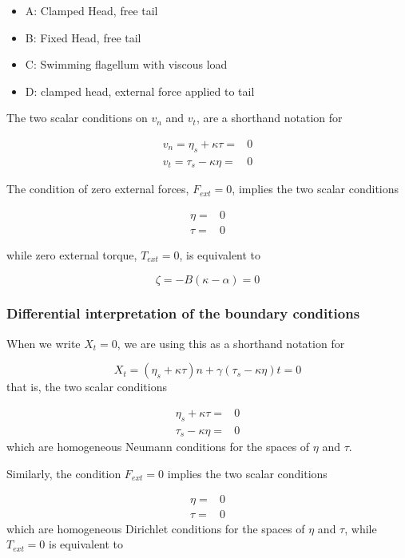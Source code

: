 \documentclass[12pt]{article}
\begin{document}
\begin{itemize}
\item A: Clamped Head, free tail
\item B: Fixed Head, free tail
\item C: Swimming flagellum with viscous load 
\item D: clamped head, external force applied to tail
\end{itemize}

The two scalar conditions on $v_n$ and $v_t$, are a shorthand notation for

$$
\begin{aligned}
v_n = \eta_s + \kappa \tau = & 0 \\
v_t = \tau_s - \kappa \eta = & 0
\end{aligned}
$$

The condition of zero external forces, $F_{ext} = 0$, implies the two scalar conditions

$$
\begin{aligned}
\eta = &0 \\
\tau = &0
\end{aligned}
$$

while zero external torque, $T_{ext} = 0$, is equivalent to 

$$
\zeta = -B(\kappa-\alpha) = 0
$$

\subsubsection{Differential interpretation of the boundary
conditions}\label{differential-interpretation-of-the-boundary-conditions}

When we write \(X_t = 0\), we are using this as a shorthand notation for

\[X_t =  (\eta_s + \kappa \tau) n + \gamma(\tau_s - \kappa \eta) t = 0\]
%
that is, the two scalar conditions

\[\begin{aligned}
\eta_s + \kappa \tau = &0 \\
\tau_s - \kappa \eta = &0
\end{aligned}\]
%
which are homogeneous Neumann conditions for the spaces of $\eta$ and $\tau$.

Similarly, the condition \(F_{ext} = 0\) implies the two scalar
conditions

\[\begin{aligned}
\eta = &0 \\
\tau = &0
\end{aligned}\]
%
which are homogeneous Dirichlet conditions for the spaces of $\eta$
and $\tau$, while \(T_{ext} = 0\) is equivalent to
\end{document}
